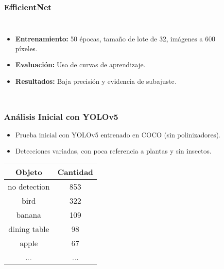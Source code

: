 \begin{frame}
    \frametitle{EfficientNet}  
    \vspace*{-5mm}
    \begin{columns}
    \begin{itemize}
        \item \textbf{Entrenamiento:} 50 épocas, tamaño de lote de 32, imágenes a 600 píxeles.
        \item \textbf{Evaluación:} Uso de curvas de aprendizaje.
        \item \textbf{Resultados:} Baja precisión y evidencia de subajuste.
    \end{itemize}
    \vspace*{-0.5cm}
    \begin{center}
    \end{center}
    \end{columns}
\end{frame}



\begin{frame}
    \frametitle{Análisis Inicial con YOLOv5}
    \begin{itemize}
        \item Prueba inicial con YOLOv5 entrenado en COCO (sin polinizadores).
        \item Detecciones variadas, con poca referencia a plantas y sin insectos.
    \end{itemize}

    \begin{center}\small
        \begin{tabular}{cc}
            \toprule
            \textbf{Objeto} & \textbf{Cantidad} \\
            \midrule
            no detection &  853 \\
            bird         &  322 \\
            banana       &  109 \\
            dining table &   98 \\
            apple        &   67 \\
            ...          &  ... \\
            \bottomrule
        \end{tabular}
    \end{center}
\end{frame}    


